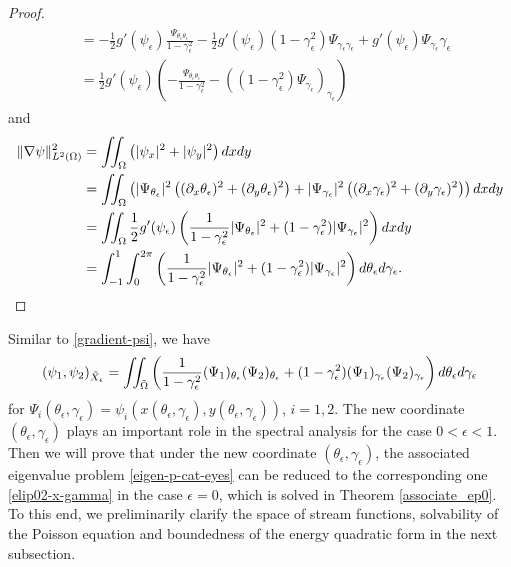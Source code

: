 \documentclass[1 [leqno, 11pt]{amsart}
\numberwithin{equation}{section}
\let\ep=\epsilon
\def\gep{\gamma_\epsilon}
\begin{document}
\begin{CJK*}{GBK}{song}
\begin{proof}
\begin{align*}
\begin{split}
&= -\frac 1 2 g'(\psi_\epsilon) \frac{\Psi_{\theta_\ep \theta_\ep}}{1-\gamma_\ep^2} - \frac 1 2 g'(\psi_\epsilon)(1-\gamma_\ep^2)\Psi_{\gamma_\ep \gamma_\ep} +  g'(\psi_\epsilon)\Psi_{\gamma_\ep}\gamma_\ep\\
&= \frac 1 2 g'(\psi_\ep) \left( -\frac{\Psi_{\theta_\ep \theta_\ep}}{1-\gamma_\ep^2} - \left( (1-\gamma_\ep^2)\Psi_{\gamma_\ep} \right)_{\gamma_\ep} \right)
\end{split}
\end{align*}
and
\begin{align*}
\|\nabla \psi\|^2_{L^2(\Omega)}
& = \iint_\Omega\left( |\psi_x|^2 + |\psi_y|^2\right)dxdy \\
& = \iint_\Omega\left( |\Psi_{\theta_\ep}|^2 \left((\partial_x \theta_\ep)^2 + (\partial_y \theta_\ep)^2\right) + |\Psi_{\gamma_\ep}|^2 \left((\partial_x \gamma_\ep)^2 + (\partial_y \gamma_\ep)^2\right)\right) dxdy \\
& = \iint_\Omega \frac 1 2 g'(\psi_\ep) \left( {1\over1-\gamma_\ep^2}|\Psi_{\theta_\ep}|^2+(1-\gamma_\ep^2)|\Psi_{\gamma_\ep}|^2 \right) dx dy \\
&=\int_{-1}^1\int_{0}^{2\pi} \left({1\over1-\gamma_\ep^2}|\Psi_{\theta_\ep}|^2+(1-\gamma_\ep^2)|\Psi_{\gamma_\ep}|^2\right)d \theta_\ep d\gamma_\ep.
\end{align*}
\end{proof}
Similar to \eqref{gradient-psi}, we have
\begin{align}\label{psi-X-ep-inner product}
( \psi_1,\psi_2)_{\tilde X_\ep}=\iint_{\tilde \Omega}\left({1\over1-\gamma_\ep^2}(\Psi_{1})_{\theta_\ep}(\Psi_{2})_{\theta_\ep}+(1-\gamma_\ep^2)(\Psi_{1})_{\gamma_\ep}(\Psi_{2})_{\gamma_\ep}\right)d \theta_\ep d\gamma_\ep\end{align}
for $\Psi_i(\theta_\ep, \gamma_\ep) = \psi_i(x(\theta_\ep, \gamma_\ep),y(\theta_\ep, \gamma_\ep))$, $i=1,2$.
The new coordinate $(\theta_\ep, \gep)$ plays an important role in  the spectral  analysis for  the case $0 < \ep < 1$.
\fi
Then we will prove that under the new coordinate $(\theta_\ep, \gep)$, the associated eigenvalue problem \eqref{eigen-p-cat-eyes} can be reduced to the corresponding one \eqref{elip02-x-gamma} in the  case  $\ep = 0$, which is solved in Theorem \ref{associate_ep0}. To this end, we preliminarily clarify the space of stream functions, solvability of the Poisson equation and boundedness of the energy quadratic form in the next subsection.

\end{CJK*}
\end{document}
